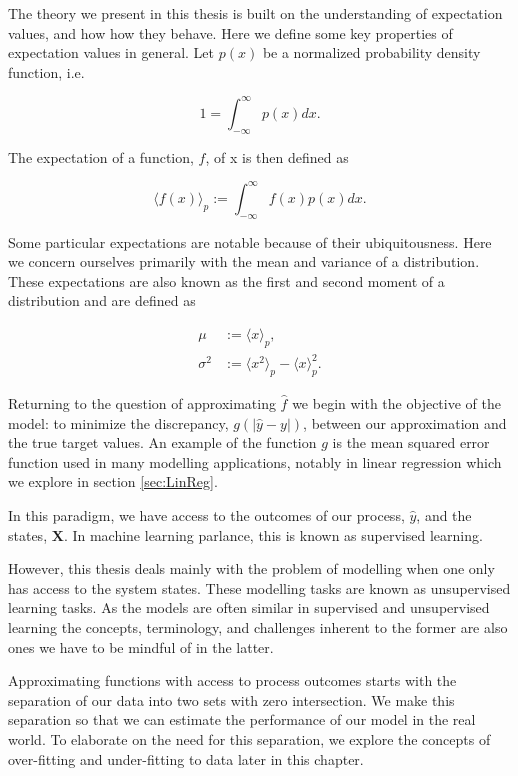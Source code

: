 The theory we present in this thesis is built on the understanding of expectation values, and how how they behave.  Here we define some key properties of expectation values in general. Let $p(x)$ be a normalized probability density function, i.e.

\begin{equation}
1 = \int_{-\infty}^\infty p(x) dx.
\end{equation}

\noindent The expectation of a function, $f$, of x is then defined as 

\begin{equation}\label{eq:expect}
\langle f(x) \rangle_p :=\int_{-\infty}^\infty f(x) p(x) dx.
\end{equation}

\noindent Some particular expectations are notable because of their ubiquitousness. Here we concern ourselves primarily with the mean and variance of a distribution. These expectations are also known as the first and second moment of a distribution and are defined as

\begin{align}
\mu &:= \langle x \rangle_p, \\
\sigma^2 &:= \langle x^2 \rangle_p  - \langle x\rangle_p^2.
\end{align}

\noindent Returning to the question of approximating $\hat{f}$ we begin with the objective of the model: to minimize the discrepancy, $g(|\hat{y} - y|)$, between our approximation and the true target values. An example of the function $g$ is the mean squared error function used in many modelling applications, notably in linear regression which we explore in section \ref{sec:LinReg}.

In this paradigm, we have access to the outcomes of our process, $\hat{y}$, and the states, $\mathbf{X}$. In machine learning parlance, this is known as supervised learning. 

However, this thesis deals mainly with the problem of modelling when one only has access to the system states. These modelling tasks are known as unsupervised learning tasks. As the models are often similar in supervised and unsupervised learning the concepts, terminology, and challenges inherent to the former are also ones we have to be mindful of in the latter.

Approximating functions with access to process outcomes starts with the separation of our data into two sets with zero intersection. We make this separation so that we can estimate the performance of our model in the real world. To elaborate on the need for this separation, we explore the concepts of over-fitting and under-fitting to data later in this chapter.